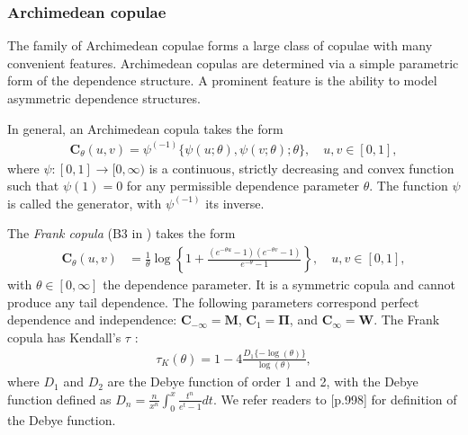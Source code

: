 \subsubsection{Archimedean copulae}\label{sec:archimedean-copula}
The family of Archimedean copulae forms a large class of copulae with
many convenient features.
Archimedean copulas are determined via a simple parametric form of the
dependence structure. A prominent feature is the ability to model
asymmetric dependence structures.  

In general, an Archimedean copula takes the form
\begin{align*}
  \bm{C}_\theta(u,v) = \psi^{(-1)}\{\psi(u; \theta), \psi(v; \theta); \theta\},\quad u,v\in [0,1],
    \end{align*}
where $\psi:[0,1] \rightarrow [0,\infty)$ is a continuous, strictly
decreasing and convex function such that $\psi(1)=0$ for any
permissible dependence parameter $\theta$. The function $\psi$ is 
called the generator, with $\psi^{(-1)}$ its inverse.

The {\em Frank copula\/} (B3 in \citet{joe1997multivariate}) takes the form
\begin{align*}
    \bm{C}_{\theta}(u,v) &= \frac{1}{\theta}
    \log \left\{
    1 + \frac{(e^{-\theta u}-1)(e^{-\theta v}-1)}{e^{-\theta}-1}
    \right\}, \quad u,v\in [0,1],
    \end{align*}
    with $\theta \in [0, \infty]$ the dependence parameter. 
    It is a symmetric copula and cannot produce any tail
    dependence. The following parameters correspond perfect dependence
    and independence: $\bm{C}_{-\infty} = \bm{M}$, $\bm{C}_1 = \bm{\Pi}$,
    and $\bm{C}_\infty = \bm{W}$. 
    The Frank copula has Kendall's $\tau$ :
\begin{align*}
    \tau_K(\theta) = 1-4\frac{D_1\{-\log(\theta)\}}{\log(\theta)},
    \end{align*}
where $D_1$ and $D_2$ are the Debye function of order 1 and 2, with
the Debye function defined as $D_n =
\frac{n}{x^n}\int_0^x\frac{t^n}{e^t-1}dt$.
We refer readers to \cite{abramowitz1972handbook}[p.998] for definition of the Debye function. 

